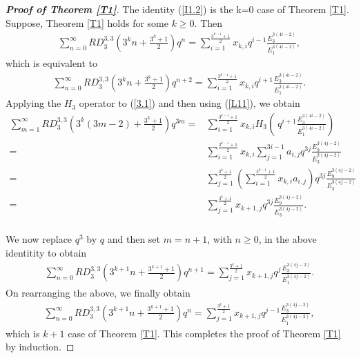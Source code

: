 \documentclass[11pt,a4paper]{article}
\numberwithin{equation}{section}
\theoremstyle{plain}
\begin{document}
	\begin{proof}[\it\textbf{Proof of Theorem \ref{T1}}]
		The identity (\ref{I1.2}) is the k=0 case of Theorem \ref{T1}.
		Suppose, Theorem \ref{T1} holds for some $k\geq0$. Then
			\begin{align*}
			\sum_{n=0}^{\infty}RD_3^{3,3}\left(3^kn+\frac{3^k+1}{2}\right)q^n=\sum_{i=1}^{\frac{3^{k-1}+1}{2}}x_{k,i}q^{i-1}\frac{E_3^{3(4i-2)}}{E_1^{3(4i-2)}},
		\end{align*}
		which is equivalent to
		\begin{align}
			\sum_{n=0}^{\infty}RD_3^{3,3}\left(3^kn+\frac{3^k+1}{2}\right)q^{n+2}=\sum_{i=1}^{\frac{3^{k-1}+1}{2}}x_{k,i}q^{i+1}\frac{E_3^{3(4i-2)}}{E_1^{3(4i-2)}}.\label{3.1}
		\end{align}
		Applying the $H_3$ operator to (\ref{3.1}) and then using (\ref{L11}), we obtain
		\begin{align*}
			\sum_{m=1}^{\infty}RD_3^{3,3}\left(3^k(3m-2)+\frac{3^k+1}{2}\right)q^{3m}=&\sum_{i=1}^{\frac{3^{k-1}+1}{2}}x_{k,i}H_3\left(\ q^{i+1}\frac{E_3^{3(4i-2)}}{E_1^{3(4i-2)}}\right)\\
			=&\sum_{i=1}^{\frac{3^{k-1}+1}{2}}x_{k,i} \sum_{j=1}^{3i-1} a_{i,j}
			q^{3j} \frac{E_9^{3(4j-2)}}{E_3^{3(4j-2)}}\\
			=& \sum_{j=1}^{\frac{3^k+1}{2}}
			\left(\sum_{i=1}^{\frac{3^{k-1}+1}{2}}x_{k,i}a_{i,j}\right)	q^{3j} \frac{E_9^{3(4j-2)}}{E_3^{3(4j-2)}}\\
			=&\sum_{j=1}^{\frac{3^k+1}{2}}x_{k+1,j} q^{3j}\frac{E_9^{3(4j-2)}}{E_3^{3(4j-2)}}.\\
				\end{align*}
		
		We now replace $q^3$ by $q$ and then set $m=n+1$, with $n \geq 0$, in the above identitity to obtain
			\begin{align*}
			\sum_{n=0}^{\infty}RD_3^{3,3}\left(3^{k+1}n+\frac{3^{k+1}+1}{2}\right)q^{n+1}=\sum_{j=1}^{\frac{3^{k}+1}{2}}x_{{k+1},j}q^{j}\frac{E_3^{3(4j-2)}}{E_1^{3(4j-2)}}.	
		\end{align*}
		On rearranging the above, we finally obtain
		\begin{align*}
			\sum_{n=0}^{\infty}RD_3^{3,3}\left(3^{k+1}n+\frac{3^{k+1}+1}{2}\right)q^n=\sum_{j=1}^{\frac{3^{k}+1}{2}}x_{{k+1},j}q^{j-1}\frac{E_3^{3(4j-2)}}{E_1^{3(4j-2)}},
		\end{align*}
		which is $k+1$ case of Theorem \ref{T1}. This completes the proof of Theorem \ref{T1} by induction.
	\end{proof}
\end{document}
